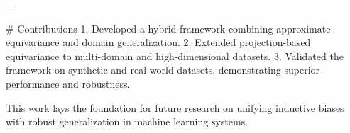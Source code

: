 ---

# Contributions
1. Developed a hybrid framework combining approximate equivariance and domain generalization.
2. Extended projection-based equivariance to multi-domain and high-dimensional datasets.
3. Validated the framework on synthetic and real-world datasets, demonstrating superior performance and robustness.

This work lays the foundation for future research on unifying inductive biases with robust generalization in machine learning systems.